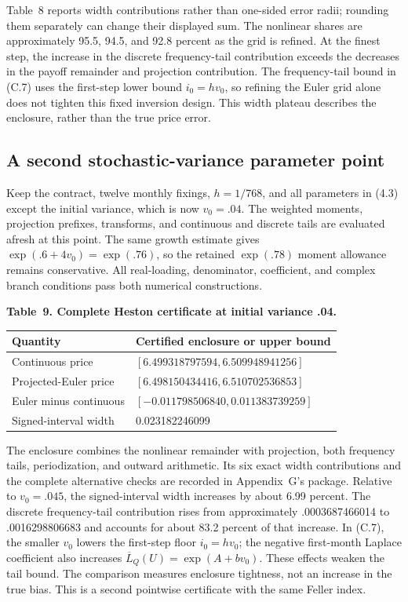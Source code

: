 \documentclass[11pt,a4paper]{article}
\begin{document}
Table~8 reports width contributions rather than one-sided error radii;
rounding them separately can change their displayed sum. The nonlinear shares
are approximately 95.5, 94.5, and 92.8 percent as the grid is refined. At the
finest step, the increase in the discrete frequency-tail contribution exceeds
the decreases in the payoff remainder and projection contribution. The
frequency-tail bound in (C.7) uses the first-step lower bound \(i_0=hv_0\),
so refining the Euler grid alone does not tighten this fixed inversion design.
This width plateau describes the enclosure, rather than the true price error.


\subsection{A second stochastic-variance parameter point}

Keep the contract, twelve monthly fixings, \(h=1/768\), and all parameters in
(4.3) except the initial variance, which is now \(v_0=.04\). The weighted
moments, projection prefixes, transforms, and continuous and discrete tails
are evaluated afresh at this point. The same growth estimate gives
\(\exp(.6+4v_0)=\exp(.76)\), so the retained \(\exp(.78)\) moment allowance
remains conservative. All real-loading, denominator, coefficient, and complex
branch conditions pass both numerical constructions.

\noindent\textbf{Table~9. Complete Heston certificate at initial variance .04.}
\begin{center}
\begin{tabularx}{\textwidth}{@{}l X@{}}
\toprule
Quantity & Certified enclosure or upper bound \\
\midrule
Continuous price & \([6.499318797594,6.509948941256]\) \\
Projected-Euler price & \([6.498150434416,6.510702536853]\) \\
Euler minus continuous & \([-0.011798506840,0.011383739259]\) \\
Signed-interval width & 0.023182246099 \\
\bottomrule
\end{tabularx}
\end{center}

The enclosure combines the nonlinear remainder with projection, both frequency
tails, periodization, and outward arithmetic. Its six exact width contributions
and the complete alternative checks are recorded in Appendix~G's package.
Relative to \(v_0=.045\), the signed-interval width increases by about
6.99 percent. The discrete frequency-tail contribution rises from approximately
.0003687466014 to .0016298806683 and accounts for about 83.2 percent of that
increase. In (C.7), the smaller \(v_0\) lowers the first-step floor
\(i_0=hv_0\); the negative first-month Laplace coefficient also increases
\(\overline L_Q(U)=\exp(A+bv_0)\). These effects weaken the tail bound.
The comparison measures enclosure tightness, not an increase in the true bias.
This is a second pointwise certificate with the same Feller index.
\end{document}
